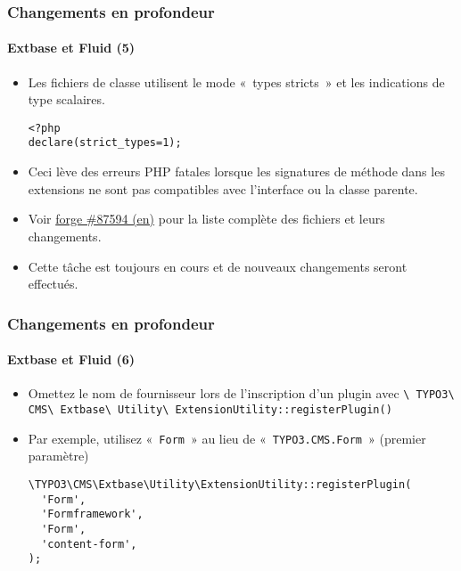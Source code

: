 \begin{frame}[fragile]
	\frametitle{Changements en profondeur}
	\framesubtitle{Extbase et Fluid (5)}

	\lstset{basicstyle=\smaller\ttfamily}

	\begin{itemize}
		\item Les fichiers de classe utilisent le mode «~types stricts~» et les indications de type scalaires.
\begin{lstlisting}
<?php
declare(strict_types=1);
\end{lstlisting}

		\item Ceci lève des erreurs PHP fatales lorsque les signatures de méthode dans les extensions
			ne sont pas compatibles avec l'interface ou la classe parente.

		\item Voir \href{https://forge.typo3.org/issues/87594}{forge \#87594 (en)}
			pour la liste complète des fichiers et leurs changements.

		\item Cette tâche est toujours en cours et de nouveaux changements seront effectués.

	\end{itemize}

\end{frame}


\begin{frame}[fragile]
	\frametitle{Changements en profondeur}
	\framesubtitle{Extbase et Fluid (6)}

	\lstset{basicstyle=\smaller\ttfamily}

	\begin{itemize}
		\item Omettez le nom de fournisseur lors de l'inscription d'un plugin avec\newline
			\smaller
				\texttt{\textbackslash
					TYPO3\textbackslash
					CMS\textbackslash
					Extbase\textbackslash
					Utility\textbackslash
					ExtensionUtility::registerPlugin()}
			\normalsize

		\item Par exemple, utilisez «~\texttt{Form}~» au lieu de «~\texttt{TYPO3.CMS.Form}~»\newline
			\small(premier paramètre)\normalsize
\begin{lstlisting}
\TYPO3\CMS\Extbase\Utility\ExtensionUtility::registerPlugin(
  'Form',
  'Formframework',
  'Form',
  'content-form',
);
\end{lstlisting}

	\end{itemize}

\end{frame}

